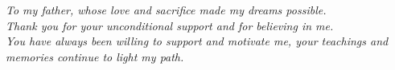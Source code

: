 %



\vspace*{\fill}
\begin{flushright} 
    \hspace{8cm}
    \begin{minipage}{7cm}
        \textit{To my father, whose love and sacrifice made my dreams possible.\\ Thank you for your unconditional support and for believing in me. \\ You have always been willing to support and motivate me, your teachings and memories continue to light my path.}
    \end{minipage}
\end{flushright}
\vspace*{\fill}





